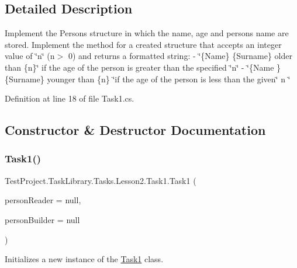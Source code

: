 \subsection{Detailed Description}
Implement the Person\textquotesingle{}s structure in which the name, age and person\textquotesingle{}s name are stored. Implement the method for a created structure that accepts an integer value of \char`\"{}n\char`\"{} (n$>$ 0) and returns a formatted string\+: -\/ \char`\"{}\{\+Name\} \{\+Surname\}
older than \{n\}\char`\"{} if the age of the person is greater than the specified \char`\"{}n\char`\"{} -\/ \char`\"{}\{\+Name \} \{\+Surname\} younger than \{n\} \char`\"{}if the age of the person is less than the given\char`\"{} n \char`\"{} 



Definition at line 18 of file Task1.\+cs.



\subsection{Constructor \& Destructor Documentation}
\mbox{\label{class_test_project_1_1_task_library_1_1_tasks_1_1_lesson2_1_1_task1_a6fe662e31ee5bfc96716b7c2230b4636}} 
\subsubsection{\texorpdfstring{Task1()}{Task1()}}
{\footnotesize\ttfamily Test\+Project.\+Task\+Library.\+Tasks.\+Lesson2.\+Task1.\+Task1 (\begin{DoxyParamCaption}\item[{I\+Reader}]{person\+Reader = {\ttfamily null},  }\item[{I\+Builder$<$ \mbox{\hyperlink{struct_test_project_1_1_task_library_1_1_tasks_1_1_lesson2_1_1_models_1_1_person}{Person}} $>$}]{person\+Builder = {\ttfamily null} }\end{DoxyParamCaption})}



Initializes a new instance of the \mbox{\hyperlink{class_test_project_1_1_task_library_1_1_tasks_1_1_lesson2_1_1_task1}{Task1}} class. 


